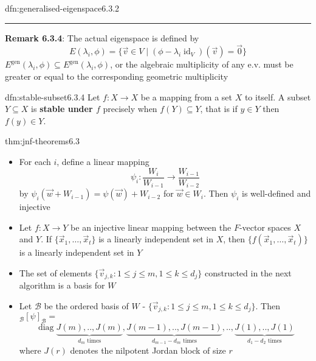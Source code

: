 \documentclass[landscape, 8pt]{extarticle}
\DeclareMathOperator{\id}{id}
\DeclareMathOperator{\diag}{diag}
\begin{document}
\begin{multicols}{3}
\begin{dfn}{dfn:generalised-eigenspace}{6.3.2}
    \noindent\rule{\textwidth}{0.2pt}
    \textbf{Remark 6.3.4}: The actual eigenspace is defined by
    \[E(\lambda_{i}, \phi) = \{\vec{v}\in V \mid (\phi - \lambda_{i} \id_{V}) (\vec{v}) = \vec{0}\}\]
    $E^{\text{gen}}(\lambda_{i}, \phi) \subseteq E^{\text{gen}}(\lambda_{i}, \phi)$, or the algebraic multiplicity of any e.v. must be greater or equal to the corresponding geometric multiplicity


\end{dfn}

\begin{dfn}{dfn:stable-subset}{6.3.4}
    Let $f : X \to X$ be a mapping from a set $X$ to itself. A subset $Y \subseteq X$ is \textbf{stable under $f$} precisely when $f(Y) \subseteq Y$, that is if $y\in Y$ then $f(y)\in Y$.
\end{dfn}

\begin{thm}{thm:jnf-theorems}{6.3}
    \begin{itemize}
        \setlength\itemsep{0em}
        \item[\textbf{6.3.6}:] For each $i$, define a linear mapping
            \[\psi_{i} : \frac{W_{i}}{W_{i - 1}} \to \frac{W_{i - 1}}{W_{i - 2}}\]
            by $\psi_{i}(\vec{w} + W_{i - 1}) = \psi(\vec{w}) + W_{i - 2}$ for $\vec{w}\in W_{i}$. Then $\psi_{i}$ is well-defined and injective
        \item[\textbf{6.3.7}:] Let $f : X \to Y$ be an injective linear mapping between the $F$-vector spaces $X$ and $Y$. If $\{\vec{x}_{1},\dots,\vec{x}_{t}\}$ is a linearly independent set in $X$, then $\{f(\vec{x}_{1},\dots,\vec{x}_{t})\}$ is a linearly independent set in $Y$
        \item[\textbf{6.3.8}:] The set of elements $\{\vec{v}_{j,k} : 1 \le j \le m, 1 \le k \le d_{j}\}$ constructed in the next algorithm is a basis for $W$
        \item[\textbf{6.3.9}:] Let $\mathcal{B}$ be the ordered basis of $W$ - $\{\vec{v}_{j,k} : 1 \le j \le m, 1 \le k \le d_{j}\}$. Then ${}_{\mathcal{B}}[\psi]_{\mathcal{B}} = $
            \[\diag \underbrace{J(m),. .,J(m)}_{\text{$d_{m}$ times}}, \underbrace{J(m-1),. .,J(m-1)}_{\text{$d_{m - 1} - d_{m}$ times}},. .,\underbrace{J(1), . .,J(1)}_{\text{$d_{1} - d_{2}$ times}}\]
            where $J(r)$ denotes the nilpotent Jordan block of size $r$
    \end{itemize}
\end{thm}


\end{multicols}
\end{document}
